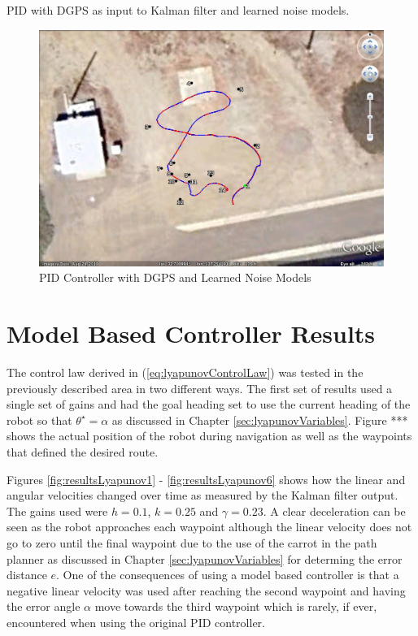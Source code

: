 PID with DGPS as input to Kalman filter and learned noise models.

\begin{figure}[ht!]
	\centering
	\includegraphics[width=.75\textwidth]{images/GE/20101203_1803_kf_pidUsingDgpsNewQR}
	\caption{PID Controller with DGPS and Learned Noise Models}
	\label{fig:kfResults6}
\end{figure}

\section{Model Based Controller Results}
\label{sec:lyapunovResults}
The control law derived in (\ref{eq:lyapunovControlLaw}) was tested in the previously described area in two different ways. The first set of results used a single set of gains and had the goal heading set to use the current heading of the robot so that $\theta^\star=\alpha$ as discussed in Chapter \ref{sec:lyapunovVariables}. Figure *** shows the actual position of the robot during navigation as well as the waypoints that defined the desired route.

Figures \ref{fig:resultsLyapunov1} - \ref{fig:resultsLyapunov6} shows how the linear and angular velocities changed over time as measured by the Kalman filter output. The gains used were $h=0.1$, $k=0.25$ and $\gamma=0.23$. A clear deceleration can be seen as the robot approaches each waypoint although the linear velocity does not go to zero until the final waypoint due to the use of the carrot in the path planner as discussed in Chapter \ref{sec:lyapunovVariables} for determing the error distance $e$. One of the consequences of using a model based controller is that a negative linear velocity was used after reaching the second waypoint and having the error angle $\alpha$ move towards the third waypoint which is rarely, if ever, encountered when using the original PID controller.

